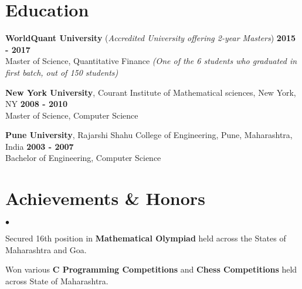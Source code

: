 \documentclass[margin,line]{res}
\newenvironment{list2}{
  \begin{list}{$\bullet$}{%
      \setlength{\itemsep}{0.05in}
      \setlength{\parsep}{0in} \setlength{\parskip}{0in}
      \setlength{\topsep}{-0.1in} \setlength{\partopsep}{0in}
      \setlength{\leftmargin}{0.2in}}}{\end{list}}
\begin{document}
\begin{resume}
\section{\sc Education}
{\bf WorldQuant University} ({\em Accredited University offering 2-year Masters}) \hfill {\bf  2015 - 2017}\\
Master of Science, Quantitative Finance {\em (One of the 6 students who graduated in first batch, out of 150 students)}

{\bf New York University}, Courant Institute of Mathematical sciences, New York, NY \hfill {\bf 2008 - 2010}\\
Master of Science, Computer Science

{\bf Pune University}, Rajarshi Shahu College of Engineering, Pune, Maharashtra, India \hfill{\bf 2003 - 2007}\\
Bachelor of Engineering, Computer Science


\section{\sc Achievements \& Honors}
\begin{list2}
\item Secured 16th position in {\bf Mathematical Olympiad} held across the States of Maharashtra and Goa.
\item Won various {\bf C Programming Competitions} and {\bf Chess Competitions} held across State of Maharashtra.
\end{list2}


\end{resume}
\end{document}
